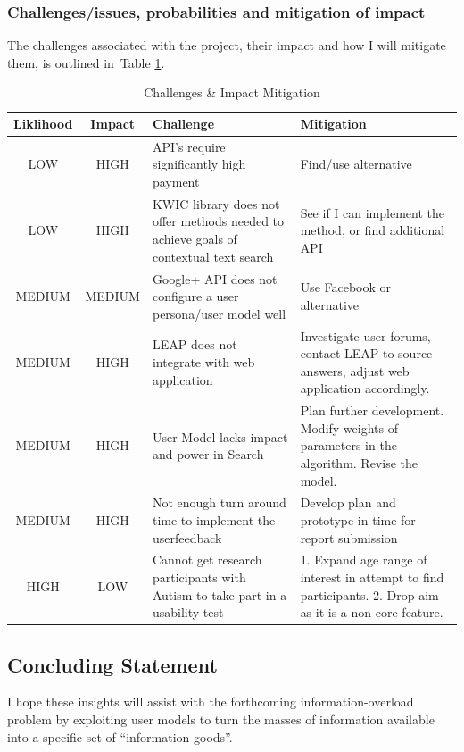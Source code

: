 \documentclass[a4paper, 10pt]{article}
\begin{document}
\subsubsection{Challenges/issues, probabilities and mitigation of impact}
The challenges associated with the project, their impact and how I will mitigate them, is outlined in~Table \ref{risks}. 
\begin{table}[H]
\caption{Challenges \& Impact Mitigation} 
\centering
\begin{tabular}{|c | c | p{5cm} | p{5cm} |}
\hline\hline 
Liklihood & Impact & Challenge & Mitigation\\ [0.5ex]
\hline 
LOW & HIGH & API's require significantly high payment & Find/use alternative\\
\hline 
LOW & HIGH & KWIC library does not offer methods needed to achieve goals of contextual text search & See if I can implement the method, or find additional API\\
\hline 
MEDIUM & MEDIUM & Google+ API does not configure a user persona/user model well & Use Facebook or alternative\\
\hline 
MEDIUM & HIGH & LEAP does not integrate with web application & Investigate user forums, contact LEAP to source answers, adjust web application accordingly.\\
\hline
MEDIUM & HIGH & User Model lacks impact and power in Search & Plan further development. Modify weights of parameters in the algorithm. Revise the model. \\
\hline 
MEDIUM & HIGH & Not enough turn around time to implement the userfeedback & Develop plan and prototype in time for report submission\\
\hline
HIGH & LOW & Cannot get research participants with Autism to take part in a usability test & 1. Expand age range of interest in attempt to find participants. 2. Drop aim as it is a non-core feature.\\ 
\hline[1ex]

\end{tabular}
\label{risks} 
\end{table}

\subsection{Concluding Statement}\label{future}
I hope these insights will assist with the forthcoming information-overload problem by exploiting user models to turn the masses of information available into a specific set of “information goods”. 
\end{document}
